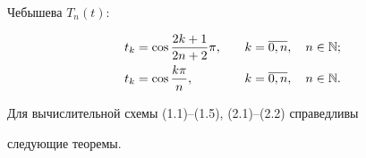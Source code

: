 Чебышева $T_n(t)$:


\begin{alignat}{2}


t_k &= \cos \frac{2k+1}{2n+2}\pi,&\quad k&=\ol{0,n},\quad n\in \N;\\


%


t_k &= \cos\frac{k\pi}{n},&\quad k&=\ol{0,n},\quad n\in\N.


\end{alignat}





Для вычислительной схемы (1.1)--(1.5), (2.1)--(2.2) справедливы 


следующие теоремы.





